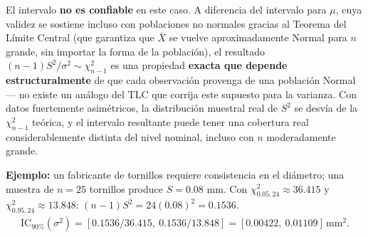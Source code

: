 \begin{solproblema}
	El intervalo \textbf{no es confiable} en este caso. A diferencia del intervalo para $\mu$, cuya validez se sostiene incluso con poblaciones no normales gracias al Teorema del Límite Central (que garantiza que $\bar X$ se vuelve aproximadamente Normal para $n$ grande, sin importar la forma de la población), el resultado $(n-1)S^2/\sigma^2\sim\chi^2_{n-1}$ es una propiedad \textbf{exacta que depende estructuralmente} de que cada observación provenga de una población Normal — no existe un análogo del TLC que corrija este supuesto para la varianza. Con datos fuertemente asimétricos, la distribución muestral real de $S^2$ se desvía de la $\chi^2_{n-1}$ teórica, y el intervalo resultante puede tener una cobertura real considerablemente distinta del nivel nominal, incluso con $n$ moderadamente grande.
\end{solproblema}

\begin{solproblema}[prob:866061e]
	\textbf{Ejemplo:} un fabricante de tornillos requiere consistencia en el diámetro; una muestra de $n=25$ tornillos produce $S=0.08$ mm. Con $\chi^2_{0.05,24}\approx36.415$ y $\chi^2_{0.95,24}\approx13.848$: $(n-1)S^2 = 24(0.08)^2 = 0.1536$.
	\begin{align*}
		\text{IC}_{90\%}(\sigma^2) = [0.1536/36.415,\ 0.1536/13.848] = [0.00422,\ 0.01109]\,\text{mm}^2.
	\end{align*}
\end{solproblema}
